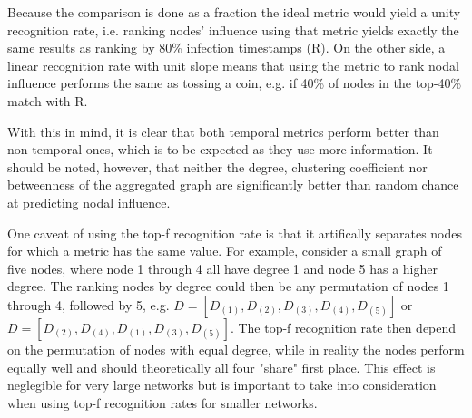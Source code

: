 \documentclass[letterpaper]{article}
\begin{document}
Because the comparison is done as a fraction the ideal metric would yield a unity recognition rate, i.e. ranking nodes' influence using that metric yields exactly the same results as ranking by 80\% infection timestamps (R). 
On the other side, a linear recognition rate with unit slope means that using the metric to rank nodal influence performs the same as tossing a coin, e.g. if 40\% of nodes in the top-40\% match with R.

With this in mind, it is clear that both temporal metrics perform better than non-temporal ones, which is to be expected as they use more information.
It should be noted, however, that neither the degree, clustering coefficient nor betweenness of the aggregated graph are significantly better than random chance at predicting nodal influence.

One caveat of using the top-f recognition rate is that it artifically separates nodes for which a metric has the same value. For example, consider a small graph of five nodes, where node 1 through 4 all have degree 1 and node 5 has a higher degree. The ranking nodes by degree could then be any permutation of nodes 1 through 4, followed by 5, e.g. \(D=[D_{(1)},D_{(2)},D_{(3)},D_{(4)},D_{(5)}]\) or \(D=[D_{(2)},D_{(4)},D_{(1)},D_{(3)},D_{(5)}]\). The top-f recognition rate then depend on the permutation of nodes with equal degree, while in reality the nodes perform equally well and should theoretically all four "share" first place. This effect is neglegible for very large networks but is important to take into consideration when using top-f recognition rates for smaller networks.
\end{document}
